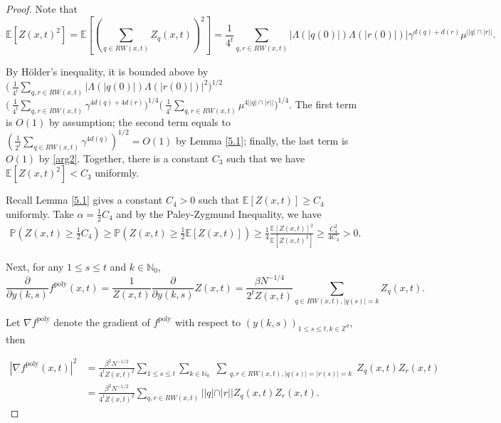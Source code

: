 \documentclass[10pt]{article}
\begin{document}
\begin{proof}
Note that \begin{equation} \label{arg3}
    \mathbb{E}[Z(x,t)^2]  = \mathbb{E}[(\sum_{q \in RW(x,t)} Z_q(x,t))^2] = \frac{1}{4^t}\sum_{q, r \in RW(x,t)} 
|\Lambda(|q(0)|)\Lambda(|r(0)|)|\gamma^{d(q)+d(r)} \mu^{\left| |q|\cap |r|\right|}.
\end{equation}

By Hölder's inequality, it is bounded above by $\Big(\:\frac{1}{4^t}\sum_{q, r \in RW(x,t)} |\Lambda(|q(0)|)\Lambda(|r(0)|)|^2\Big)^{1/2}$ \\ $\big(\:\frac{1}{4^t}\sum_{q, r \in RW(x,t)} \gamma^{4d(q)+4d(r)} \big)^{1/4} \big(\:\frac{1}{4^t}\sum_{q, r \in RW(x,t)}  \mu^{4\left||q|\cap |r|\right|}\big)^{1/4}$. The first term is $O(1)$ by assumption; the second term equals to $(\frac{1}{2^t}\sum_{q \in RW(x,t)} \gamma^{4d(q)} )^{1/2}=O(1)$ by Lemma \ref{5.1}; finally, the last term is $O(1)$ by \eqref{arg2}. Together, there is a constant $C_3$ such that we have $\mathbb{E}[Z(x,t)^2] < C_3$ uniformly. 

Recall Lemma \ref{5.1} gives a constant $C_4>0$ such that $\mathbb{E}[Z(x,t)] \geq C_4$ uniformly. Take $\alpha=\frac{1}{2}C_4$ and by the Paley-Zygmund Inequality, we have
\begin{equation}
    \begin{aligned}
    \mathbb{P}(Z(x,t) \geq \frac{1}{2}C_4) \geq \mathbb{P}(Z(x,t) \geq \frac{1}{2}\mathbb{E}[Z(x,t)]) \geq \frac{1}{4} \frac{\mathbb{E}[Z(x,t)]^2}{\mathbb{E}[Z(x,t)^2]} \geq \frac{C_4^2}{4C_3} > 0.
\end{aligned}
\end{equation}



Next, for any $1 \leq s \leq t$ and $k \in \mathbb{N}_0$, 
\begin{equation}
    \frac{\partial}{\partial y(k,s)} f^{\text{poly}}(x,t)  =\frac{1}{Z(x,t)} \frac{\partial}{\partial y(k,s)} Z(x,t)  =\frac{\beta N^{-1/4}}{2^{t} Z(x,t)} \sum_{q \in RW(x,t), |q(s)|=k} Z_{q}(x,t).
\end{equation}

Let $\nabla f^{\text{poly}}$ denote the gradient of $f^{\text{poly}}$ with respect to $\left(y(k,s)\right)_{1 \leq s \leq t, k \in \mathbb{Z}^{d}}$, then

\begin{align}
|\nabla f^{\text{poly}}(x,t)|^{2} & =\frac{\beta^{2}N^{-1/2}}{4^{ t} Z(x,t)^{2}} \sum_{1 \leq s \leq t} \sum_{k \in \mathbb{N}_0} \; \sum_{\substack{q, r \in RW(x,t), |q(s)|=|r(s)|=k}} Z_q(x,t)Z_r(x,t) \\
& =\frac{\beta^{2}N^{-1/2}}{4^{ t} Z(x,t)^{2}} \sum_{q, r \in RW(x,t)}||q| \cap |r|| Z_q(x,t)Z_r(x,t) .
\end{align}



\end{proof}
\end{document}

